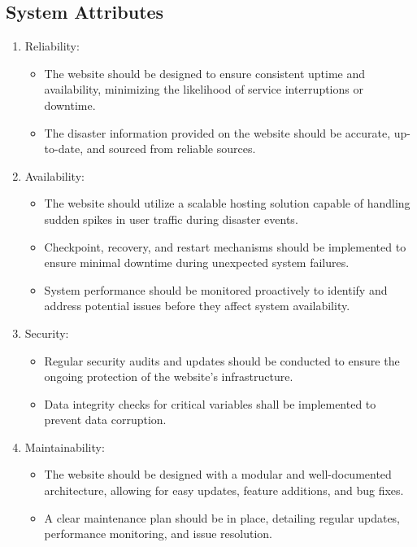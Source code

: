\documentclass[11pt,a4paper]{article}
\begin{document}
\subsection{System Attributes}
\begin{enumerate}

\item Reliability:
\begin{itemize}
    \item The website should be designed to ensure consistent uptime and availability, minimizing the likelihood of service interruptions or downtime.
    \item The disaster information provided on the website should be accurate, up-to-date, and sourced from reliable sources.
\end{itemize}

\item Availability:
\begin{itemize}
    \item The website should utilize a scalable hosting solution capable of handling sudden spikes in user traffic during disaster events.
    \item Checkpoint, recovery, and restart mechanisms should be implemented to ensure minimal downtime during unexpected system failures.
    \item  System performance should be monitored proactively to identify and address potential issues before they affect system availability.
\end{itemize}

\item Security:
\begin{itemize}
    \item Regular security audits and updates should be conducted to ensure the ongoing protection of the website's infrastructure.
    \item Data integrity checks for critical variables shall be implemented to prevent data corruption.
\end{itemize}

\item Maintainability:
\begin{itemize}
    \item The website should be designed with a modular and well-documented architecture, allowing for easy updates, feature additions, and bug fixes.
    \item A clear maintenance plan should be in place, detailing regular updates, performance monitoring, and issue resolution.
\end{itemize}


\end{enumerate}
\end{document}
